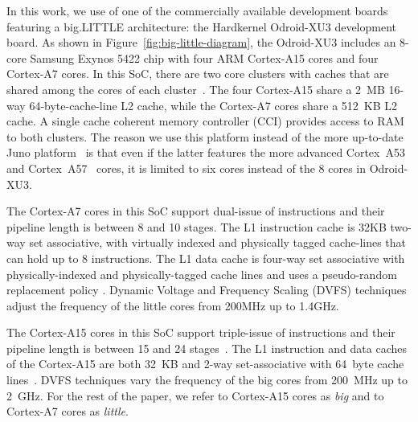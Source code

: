 In this work, we use of one of the commercially available development boards featuring a big.LITTLE architecture: the Hardkernel Odroid-XU3 development board. 
As shown in Figure~\ref{fig:big-little-diagram}, the Odroid-XU3 includes an 8-core Samsung Exynos 5422 chip with four ARM Cortex-A15 cores and four Cortex-A7 cores. 
In this SoC, there are two core clusters with caches that are shared among the cores of each cluster~\cite{GWENAPP}. 
The four Cortex-A15 share a 2~MB 16-way 64-byte-cache-line L2 cache, while the Cortex-A7 cores share a 512~KB L2 cache. 
A single cache coherent memory controller (CCI) provides access to RAM to both clusters.
The reason we use this platform instead of the more up-to-date Juno platform~\cite{Juno} is that even if the latter features the more advanced Cortex~A53~\cite{MPR_A53} and Cortex~A57~\cite{MPR_A57} cores, it is limited to six cores instead of the 8 cores in Odroid-XU3.



The Cortex-A7 cores in this SoC support dual-issue of instructions and their pipeline length is between 8 and 10 stages. 
The L1 instruction cache is 32KB two-way set associative, with virtually indexed and physically tagged cache-lines that can hold up to 8 instructions. 
The L1 data cache is four-way set associative with physically-indexed and physically-tagged cache lines and uses a pseudo-random replacement policy \cite{TRM_A7}. 
Dynamic Voltage and Frequency Scaling (DVFS) techniques adjust the frequency of the little cores from 200MHz up to 1.4GHz.

The Cortex-A15 cores in this SoC support triple-issue of instructions and their pipeline length is between 15 and 24 stages~\cite{MPR_A15}. 
The L1 instruction and data caches of the Cortex-A15 are both 32~KB and 2-way set-associative with 64~byte cache lines~\cite{TRM_A15}. 
DVFS techniques vary the frequency of the big cores from 200~MHz up to 2~GHz.
For the rest of the paper, we refer to Cortex-A15 cores as \textit{big} and to Cortex-A7 cores as \textit{little}.


